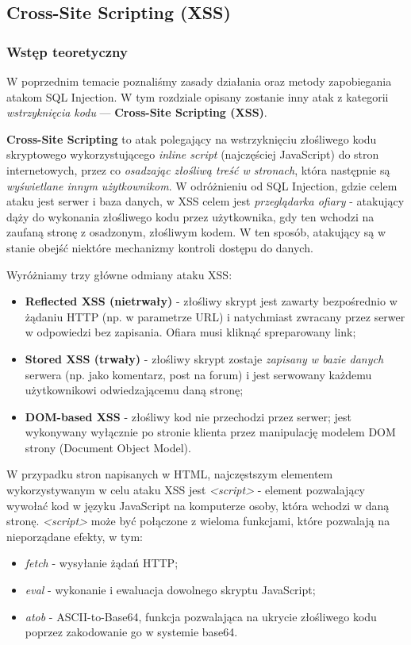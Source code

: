 \documentclass[12pt,a4paper]{article}
\begin{document}
\subsection{Cross-Site Scripting (XSS)}

\subsubsection{Wstęp teoretyczny}
W poprzednim temacie poznaliśmy zasady działania oraz metody zapobiegania atakom SQL Injection.
W tym rozdziale opisany zostanie inny atak z kategorii \emph{wstrzyknięcia kodu} ---
\textbf{Cross-Site Scripting (XSS)}.

\textbf{Cross-Site Scripting} to atak polegający na wstrzyknięciu złośliwego kodu skryptowego wykorzystującego \emph{inline script}
(najczęściej JavaScript) do stron internetowych, przez co \emph{osadzając złośliwą treść w stronach}, która następnie są 
\emph{wyświetlane innym użytkownikom}. W odróżnieniu od SQL Injection, gdzie celem ataku jest serwer i baza danych, 
w XSS celem jest \emph{przeglądarka ofiary} - atakujący dąży do wykonania złośliwego kodu przez użytkownika, gdy ten wchodzi na zaufaną stronę z osadzonym, złośliwym kodem.
W ten sposób, atakujący są w stanie obejść niektóre mechanizmy kontroli dostępu do danych.

Wyróżniamy trzy główne odmiany ataku XSS:
\begin{itemize}
    \item \textbf{Reflected XSS (nietrwały)} - złośliwy skrypt jest zawarty bezpośrednio w żądaniu HTTP
          (np. w parametrze URL) i natychmiast zwracany przez serwer w odpowiedzi bez zapisania.
          Ofiara musi kliknąć spreparowany link;
    \item \textbf{Stored XSS (trwały)} - złośliwy skrypt zostaje \emph{zapisany w bazie danych} serwera
          (np. jako komentarz, post na forum) i jest serwowany każdemu użytkownikowi odwiedzającemu daną stronę;
    \item \textbf{DOM-based XSS} - złośliwy kod nie przechodzi przez serwer; jest wykonywany wyłącznie
          po stronie klienta przez manipulację modelem DOM strony (Document Object Model).
\end{itemize}

W przypadku stron napisanych w HTML, najczęstszym elementem wykorzystywanym w celu ataku XSS jest \emph{<script>} - element pozwalający wywołać kod w języku JavaScript na komputerze osoby,
która wchodzi w daną stronę. \emph{<script>} może być połączone z wieloma funkcjami, które pozwalają na nieporządane efekty, w tym:
\begin{itemize}
    \item \emph{fetch} - wysyłanie żądań HTTP;
    \item \emph{eval} - wykonanie i ewaluacja dowolnego skryptu JavaScript;
    \item \emph{atob} - ASCII-to-Base64, funkcja pozwalająca na ukrycie złośliwego kodu poprzez zakodowanie go w systemie base64.
\end{itemize}
\end{document}
